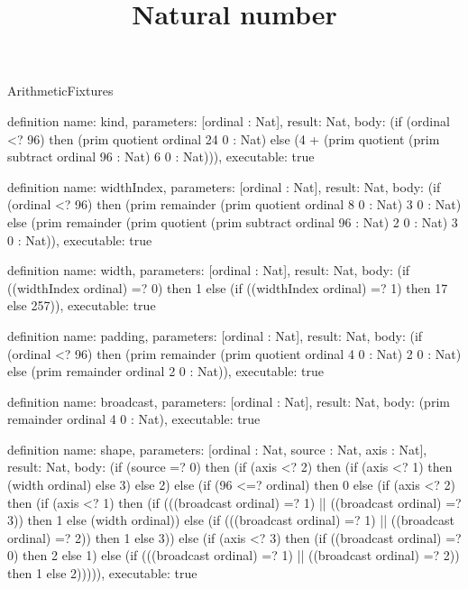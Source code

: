 \begin{lexlean}{ArithmeticFixtures}
\title{Natural number}
\begin{semanticmodule}
definition{
  name: kind,
  parameters: [ordinal : Nat],
  result: Nat,
  body: (if (ordinal <? 96) then (prim quotient ordinal 24 0 : Nat) else (4 + (prim quotient (prim subtract ordinal 96 : Nat) 6 0 : Nat))),
  executable: true
}

definition{
  name: widthIndex,
  parameters: [ordinal : Nat],
  result: Nat,
  body: (if (ordinal <? 96) then (prim remainder (prim quotient ordinal 8 0 : Nat) 3 0 : Nat) else (prim remainder (prim quotient (prim subtract ordinal 96 : Nat) 2 0 : Nat) 3 0 : Nat)),
  executable: true
}

definition{
  name: width,
  parameters: [ordinal : Nat],
  result: Nat,
  body: (if ((widthIndex ordinal) =? 0) then 1 else (if ((widthIndex ordinal) =? 1) then 17 else 257)),
  executable: true
}

definition{
  name: padding,
  parameters: [ordinal : Nat],
  result: Nat,
  body: (if (ordinal <? 96) then (prim remainder (prim quotient ordinal 4 0 : Nat) 2 0 : Nat) else (prim remainder ordinal 2 0 : Nat)),
  executable: true
}

definition{
  name: broadcast,
  parameters: [ordinal : Nat],
  result: Nat,
  body: (prim remainder ordinal 4 0 : Nat),
  executable: true
}

definition{
  name: shape,
  parameters: [ordinal : Nat, source : Nat, axis : Nat],
  result: Nat,
  body: (if (source =? 0) then (if (axis <? 2) then (if (axis <? 1) then (width ordinal) else 3) else 2) else (if (96 <=? ordinal) then 0 else (if (axis <? 2) then (if (axis <? 1) then (if (((broadcast ordinal) =? 1) || ((broadcast ordinal) =? 3)) then 1 else (width ordinal)) else (if (((broadcast ordinal) =? 1) || ((broadcast ordinal) =? 2)) then 1 else 3)) else (if (axis <? 3) then (if ((broadcast ordinal) =? 0) then 2 else 1) else (if (((broadcast ordinal) =? 1) || ((broadcast ordinal) =? 2)) then 1 else 2))))),
  executable: true
}


\end{semanticmodule}
\end{lexlean}
